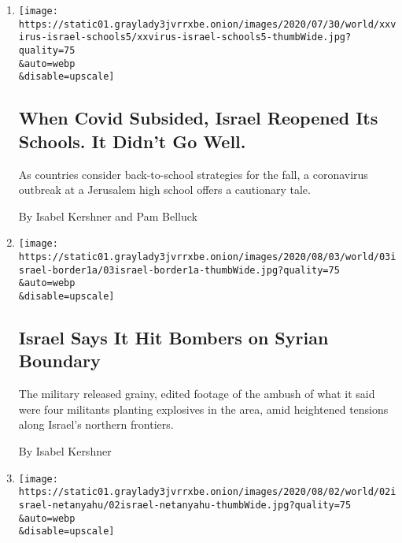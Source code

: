 \begin{enumerate}
\def\labelenumi{\arabic{enumi}.}
\item
  \href{/2020/08/04/world/middleeast/coronavirus-israel-schools-reopen.html}{}

  \texttt{[image: https://static01.graylady3jvrrxbe.onion/images/2020/07/30/world/xxvirus-israel-schools5/xxvirus-israel-schools5-thumbWide.jpg?quality=75\\\&auto=webp\\\&disable=upscale]}

  \hypertarget{when-covid-subsided-israel-reopened-its-schools-it-didnt-go-well}{%
  \subsection{When Covid Subsided, Israel Reopened Its Schools. It
  Didn't Go
  Well.}\label{when-covid-subsided-israel-reopened-its-schools-it-didnt-go-well}}

  As countries consider back-to-school strategies for the fall, a
  coronavirus outbreak at a Jerusalem high school offers a cautionary
  tale.

  By Isabel Kershner and Pam Belluck
\item
  \href{/2020/08/03/world/middleeast/israel-syria-border.html}{}

  \texttt{[image: https://static01.graylady3jvrrxbe.onion/images/2020/08/03/world/03israel-border1a/03israel-border1a-thumbWide.jpg?quality=75\\\&auto=webp\\\&disable=upscale]}

  \hypertarget{israel-says-it-hit-bombers-on-syrian-boundary}{%
  \subsection{Israel Says It Hit Bombers on Syrian
  Boundary}\label{israel-says-it-hit-bombers-on-syrian-boundary}}

  The military released grainy, edited footage of the ambush of what it
  said were four militants planting explosives in the area, amid
  heightened tensions along Israel's northern frontiers.

  By Isabel Kershner
\item
  \href{/2020/08/02/world/middleeast/israel-Netanyahus-son-tweets.html}{}

  \texttt{[image: https://static01.graylady3jvrrxbe.onion/images/2020/08/02/world/02israel-netanyahu/02israel-netanyahu-thumbWide.jpg?quality=75\\\&auto=webp\\\&disable=upscale]}

  \hypertarget{israeli-court-rebukes-prime-ministers-son-over-harassing-protest-leaders}{%
}
\end{enumerate}
